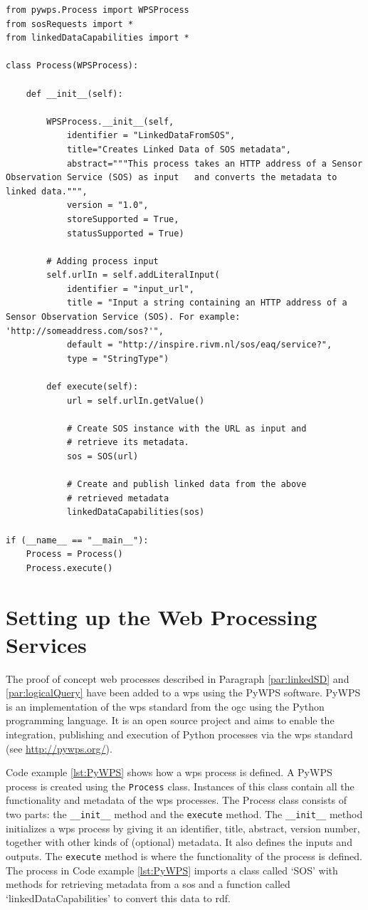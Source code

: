\begin{lstlisting}[float,caption={Script that defines a web proces using PyWPS}, label={lst:PyWPS}]
from pywps.Process import WPSProcess
from sosRequests import *
from linkedDataCapabilities import *

class Process(WPSProcess):

	def __init__(self):

		WPSProcess.__init__(self,
			identifier = "LinkedDataFromSOS",
			title="Creates Linked Data of SOS metadata",
			abstract="""This process takes an HTTP address of a Sensor Observation Service (SOS) as input 	and converts the metadata to linked data.""",
			version = "1.0",
			storeSupported = True,
			statusSupported = True)

		# Adding process input
		self.urlIn = self.addLiteralInput(
			identifier = "input_url", 
			title = "Input a string containing an HTTP address of a Sensor Observation Service (SOS). For example: 'http://someaddress.com/sos?'", 
			default = "http://inspire.rivm.nl/sos/eaq/service?", 
			type = "StringType")

		def execute(self):
			url = self.urlIn.getValue()

			# Create SOS instance with the URL as input and 
			# retrieve its metadata.  
			sos = SOS(url)

			# Create and publish linked data from the above 
			# retrieved metadata
			linkedDataCapabilities(sos)

if (__name__ == "__main__"):
	Process = Process()
	Process.execute()
\end{lstlisting}

\section{Setting up the Web Processing Services}
\label{impl:wps}

The proof of concept web processes described in Paragraph \ref{par:linkedSD} and \ref{par:logicalQuery} have been added to a \ac{wps} using the PyWPS software. PyWPS is an implementation of the \acl{wps} standard from the \acl{ogc} using the Python programming language. It is an open source project and aims to enable the integration, publishing and execution of Python processes via the \ac{wps} standard (see \url{http://pywps.org/}).  

Code example \ref{lst:PyWPS} shows how a \ac{wps} process is defined. A PyWPS process is created using the \texttt{Process} class. Instances of this class contain all the functionality and metadata of the \ac{wps} processes. The Process class consists of two parts: the \texttt{\_\_init\_\_} method and the \texttt{execute} method. The \texttt{\_\_init\_\_} method initializes a \ac{wps} process by giving it an identifier, title, abstract, version number, together with other kinds of (optional) metadata. It also defines the inputs and outputs. The \texttt{execute} method is where the functionality of the process is defined. The process in Code example \ref{lst:PyWPS} imports a class called `SOS' with methods for retrieving metadata from a \acl{sos} and a function called `linkedDataCapabilities' to convert this data to \ac{rdf}.

